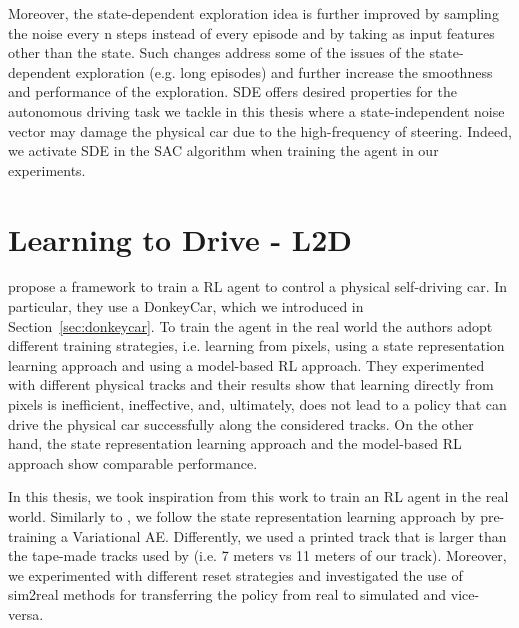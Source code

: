 Moreover, the state-dependent exploration idea is further improved by sampling the noise every n steps instead of every episode and by taking as input features other than the state. Such changes address some of the issues of the state-dependent exploration (e.g. long episodes) and further increase the smoothness and performance of the exploration. SDE offers desired properties for the autonomous driving task we tackle in this thesis where a state-independent noise vector may damage the physical car due to the high-frequency of steering. Indeed, we activate SDE in the SAC algorithm when training the agent in our experiments.

\section{Learning to Drive - L2D}

\citet{DBLP:journals/corr/abs-2008-00715} propose a framework to train a RL agent to control a physical self-driving car. In particular, they use a DonkeyCar, which we introduced in Section~\ref{sec:donkeycar}. To train the agent in the real world the authors adopt different training strategies, i.e. learning from pixels, using a state representation learning approach and using a model-based RL approach. They experimented with different physical tracks and their results show that learning directly from pixels is inefficient, ineffective, and, ultimately, does not lead to a policy that can drive the physical car successfully along the considered tracks. On the other hand, the state representation learning approach and the model-based RL approach show comparable performance.

In this thesis, we took inspiration from this work to train an RL agent in the real world. Similarly to \citet{DBLP:journals/corr/abs-2008-00715}, we follow the state representation learning approach by pre-training a Variational AE. Differently, we used a printed track that is larger than the tape-made tracks used by \citet{DBLP:journals/corr/abs-2008-00715} (i.e. 7 meters vs 11 meters of our track). Moreover, we experimented with different reset strategies and investigated the use of sim2real methods for transferring the policy from real to simulated and vice-versa.